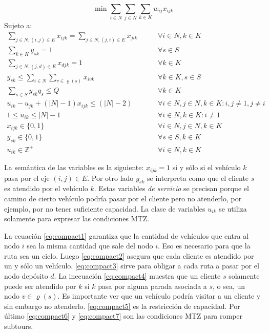 \begin{equation}
    \min \sum_{i \in N} \sum_{j \in N} \sum_{k \in K} w_{ij} x_{ijk}
\end{equation}
Sujeto a:
\begin{align}
    \sum_{j \in N, (i, j) \in E}{x_{ijk}} = \sum_{j \in N, (j, i) \in E}{x_{jik}} \qquad & \forall {i \in N, k \in K} \label{eq:compact1} \\
    \sum_{k \in K} y_{sk} = 1 \qquad & \forall {s \in S} \label{eq:compact2} \\
    \sum_{j \in N, (j, d) \in E}{x_{djk}} = 1 \qquad & \forall {k \in K} \label{eq:compact3} \\ 
    y_{sk} \leq \sum_{i \in N}\sum_{v \in \varrho(s)}{x_{ivk}} \qquad & \forall {k \in K, s \in S} \label{eq:compact4} \\
    \sum_{s \in S}{y_{sk}q_s} \le Q \qquad & \forall {k \in K} \label{eq:compact5} \\
u_{ik} - u_{jk} + (|N| - 1)x_{ijk} \leq (|N| - 2)  \qquad & \forall {i \in N, j \in N, k \in K: i,j \neq 1, j \neq i} \label{eq:compact6} \\
1 \leq u_{ik} \leq |N| - 1  \qquad & \forall {i \in N, k \in K: i \neq 1} \label{eq:compact7} \\
x_{ijk} \in \{0, 1\} \qquad & \forall {i \in N, j \in N, k \in K} \label{eq:compact8} \\
y_{sk} \in \{0, 1\} \qquad & \forall {s \in S, k \in K} \label{eq:compact9}\\
u_{ik} \in \mathbb{Z}^{+} \qquad & \forall {i \in N, k \in K} \label{eq:compact10}
\end{align}

La semántica de las variables es la siguiente: $x_{ijk} = 1$ si y sólo si el vehículo $k$ pasa por el eje $(i, j) \in E$. Por otro lado $y_{sk}$ se interpreta como que el cliente $s$ es atendido por el vehículo $k$. Estas variables \emph{de servicio} se precisan porque el camino de cierto vehículo podría pasar por el cliente pero no atenderlo, por ejemplo, por no tener suficiente capacidad. La clase de variables $u_{ik}$ se utiliza solamente para expresar las condiciones MTZ. 

La ecuación \ref{eq:compact1} garantiza que la cantidad de vehículos que entra al nodo $i$ sea la misma cantidad que sale del nodo $i$. Eso es necesario para que la ruta sea un ciclo. Luego \ref{eq:compact2} asegura que cada cliente es atendido por un y sólo un vehículo. \ref{eq:compact3} sirve para obligar a cada ruta a pasar por el nodo depósito $d$. La inecuación \ref{eq:compact4} muestra que un cliente $s$ solamente puede ser atendido por $k$ si $k$ pasa por alguna parada asociada a $s$, o sea, un nodo $v \in \varrho(s)$. Es importante ver que un vehículo podría visitar a un cliente y sin embargo no atenderlo. \ref{eq:compact5} es la restricción de capacidad. Por último \ref{eq:compact6} y \ref{eq:compact7} son las condiciones MTZ para romper subtours.

